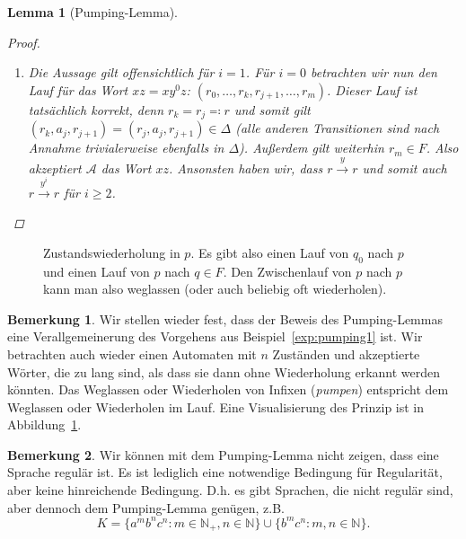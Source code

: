 \documentclass[11pt, a4paper]{article}
\theoremstyle{definition}
\newtheorem*{remark*}{Bemerkung}
\theoremstyle{plain}
\newtheorem{lemma}[definition]{Lemma}
\numberwithin{equation}{section}
\newcommand{\reaches}[1]{\overset{#1}{\rightarrow}}
\begin{document}
\begin{lemma}[Pumping-Lemma]
\begin{proof}
\begin{enumerate}
			\item Die Aussage gilt offensichtlich für $i = 1$. Für $i = 0$ betrachten wir nun den Lauf für das Wort $xz = xy^0z$: $(r_0, \ldots, r_k, r_{j+1}, \ldots, r_m)$. Dieser Lauf ist tatsächlich korrekt, denn $r_k = r_j \eqqcolon r$ und somit gilt $(r_k, a_j, r_{j+1}) = (r_j, a_j, r_{j+1}) \in \Delta$ (alle anderen Transitionen sind nach Annahme trivialerweise ebenfalls in $\Delta$). Außerdem gilt weiterhin $r_m \in F$. Also akzeptiert $\mathcal{A}$ das Wort $xz$. Ansonsten haben wir, dass $r \reaches{y} r$ und somit auch $r \reaches{y^i} r$ für $i \geq 2$.\checkmark \qedhere
		\end{enumerate}
	\end{proof}
\end{lemma}
\begin{figure}
	\centering
	
	\caption{Zustandswiederholung in $p$. Es gibt also einen Lauf von $q_0$ nach $p$ und einen Lauf von $p$ nach $q \in F$. Den Zwischenlauf von $p$ nach $p$ kann man also weglassen (oder auch beliebig oft wiederholen).}
	\label{fig:pumping}
\end{figure}
\begin{remark*}
	Wir stellen wieder fest, dass der Beweis des Pumping-Lemmas eine Verallgemeinerung des Vorgehens aus Beispiel~\ref{exp:pumping1} ist. Wir betrachten auch wieder einen Automaten mit $n$ Zuständen und akzeptierte Wörter, die zu lang sind, als dass sie dann ohne Wiederholung erkannt werden könnten. Das Weglassen oder Wiederholen von Infixen (\textit{pumpen}) entspricht dem Weglassen oder Wiederholen im Lauf.
	Eine Visualisierung des Prinzip ist in Abbildung~\ref{fig:pumping}.
\end{remark*}
\begin{remark*}
	Wir können mit dem Pumping-Lemma nicht zeigen, dass eine Sprache regulär ist. Es ist lediglich eine notwendige Bedingung für Regularität, aber keine hinreichende Bedingung. D.h. es gibt Sprachen, die nicht regulär sind, aber dennoch dem Pumping-Lemma genügen, z.B.
	$$
		K = \{a^m b^n c^n : m \in \mathbb{N}_+, n \in \mathbb{N} \} \cup \{ b^m c^n : m, n \in \mathbb{N} \}.
	$$
\end{remark*}
\end{document}
